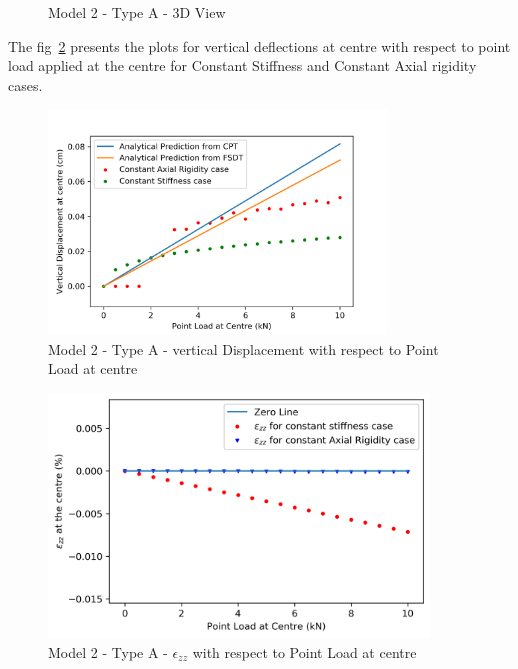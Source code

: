 \begin{figure}[!htbp]
\begin{minipage}{0.3\textwidth}
    \caption{Model 2 - Type A - 3D View}
    \label{fig:M2_a_3D}
\end{minipage}
\end{figure}

The fig~\ref{fig:M2_a_plt} presents the plots for vertical deflections at centre with respect to point load applied at the centre for Constant Stiffness and Constant Axial rigidity cases.

\begin{figure}[!htbp]
    \centering
    \includegraphics[width = 0.8\textwidth]{Figures/M2_a_plt.png}
    \caption{Model 2 - Type A - vertical Displacement with respect to Point Load at centre}
    \label{fig:M2_a_plt}
\end{figure}

\begin{figure}[!htbp]
    \centering
    \includegraphics[width = 0.9\textwidth]{Figures/M2_a_strain.png}
    \caption{Model 2 - Type A - $\epsilon_{zz}$ with respect to Point Load at centre}
    \label{fig:M2_a_strain_plt}
\end{figure}

